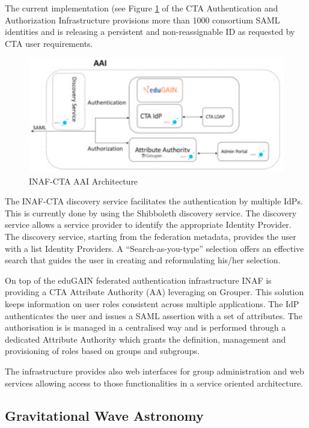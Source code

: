 \documentclass[fleqn,10pt]{wlscirep}
\begin{document}
{The current implementation\cite{costa-jgc}  (see Figure \ref{fig:ctaaai} of the CTA Authentication and Authorization Infrastructure provisions more than 1000  consortium SAML identities and is releasing a persistent and non-reassignable ID as requested by CTA user requirements. 

\begin{figure}[ht!]
  \centering
  \includegraphics[width=0.7\columnwidth]{cta-aai.png}
  \caption{INAF-CTA AAI Architecture}
  \label{fig:ctaaai}
\end{figure}

The INAF-CTA discovery service facilitates the authentication by multiple IdPs. This is currently done by using the Shibboleth discovery service. The discovery service allows a service provider to identify the appropriate Identity Provider. The discovery service, starting from the federation metadata, provides the user with a list Identity Providers. A “Search-as-you-type” selection offers an effective search that guides the user in creating and reformulating his/her selection.

On top of the eduGAIN federated authentication infrastructure INAF is providing a CTA Attribute Authority (AA) leveraging on Grouper\cite{COSTA2018}. This solution keeps information on user roles consistent across multiple applications. The IdP authenticates the user and issues a SAML assertion with a set of attributes. The authorisation is  is managed in a centralised way and is performed through a dedicated Attribute Authority which grants the definition, management and provisioning of roles based on groups and subgroups.

The infrastructure provides also web interfaces for group administration and web services allowing access to those functionalities in a service oriented architecture. 

\subsection{Gravitational Wave Astronomy}

}
\end{document}
